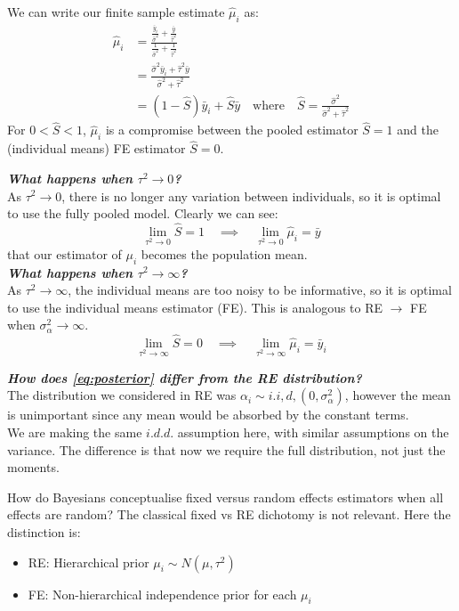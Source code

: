 \documentclass[DIV=14,titlepage=false]{scrreprt}
\begin{document}
We can write our finite sample estimate $\hat \mu_i$ as:
\begin{align*}
    \hat \mu_i & = \frac{\frac{\bar y_i}{\hat \sigma^2} + \frac{\bar y}{\hat \tau^2}}{\frac{1}{\hat \sigma^2} + \frac{1}{\hat \tau^2}} \\
    & = \frac{\hat \sigma^2 \bar y_i + \hat \tau^2 \bar y}{\hat \sigma^2 + \hat \tau^2}\\
    & = (1-\hat S)\bar y_i + \hat S \bar y \quad \text{where} \quad \hat S = \frac{\hat \sigma^2}{\hat \sigma^2 + \hat \tau^2}
\end{align*}
For $0 < \hat S < 1$, $\hat \mu_i$ is a compromise between the pooled estimator $\hat S =1$ and the (individual means) FE estimator $\hat S = 0$.\\
\begin{explanation}
    \textit{\textbf{What happens when $\tau^2 \to 0$?}}\\
    As $\tau^2 \to 0$, there is no longer any variation between individuals, so it is optimal to use the fully pooled model. Clearly we can see:
    \[
        \underset{\tau^2 \to 0}{\lim} \hat S= 1 \quad \implies \quad \underset{\tau^2 \to 0}{\lim} \hat \mu_i = \bar y
    \]
    that our estimator of $\mu_i$ becomes the population mean.\\
    \textit{\textbf{What happens when $\tau^2 \to \infty$?}}\\
    As $\tau^2 \to \infty$, the individual means are too noisy to be informative, so it is optimal to use the individual means estimator (FE). This is analogous to RE $\to$ FE when $\sigma_\alpha^2 \to \infty$.
    \[
        \underset{\tau^2 \to \infty}{\lim} \hat S= 0 \quad \implies \quad \underset{\tau^2 \to \infty}{\lim} \hat \mu_i = \bar y_i
    \]
\end{explanation}
\begin{explanation}
    \textit{\textbf{How does \eqref{eq:posterior} differ from the RE distribution?}}\\
    The distribution we considered in RE was $\alpha_i \sim i.i,d,(0, \sigma^2_\alpha)$, however the mean is unimportant since any mean would be absorbed by the constant terms. \\
    We are making the same $i.d.d.$ assumption here, with similar assumptions on the variance. The difference is that now we require the full distribution, not just the moments.
\end{explanation}
How do Bayesians conceptualise fixed versus random effects estimators when all effects are random? The classical fixed vs RE dichotomy is not relevant. Here the distinction is:
\begin{itemize}
    \item RE: Hierarchical prior $\mu_i \sim N(\mu, \tau^2)$
    \item FE: Non-hierarchical independence prior for each $\mu_i$
\end{itemize}
\end{document}
